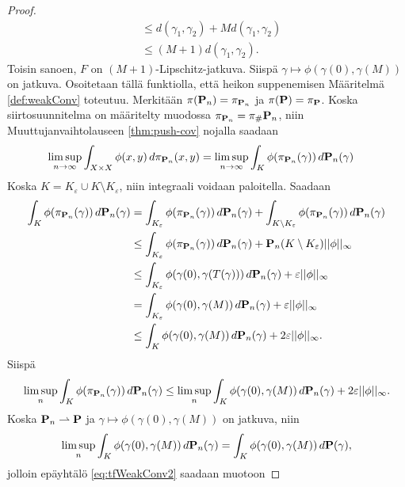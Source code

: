 \documentclass[12pt,oneside,a4paper]{amsbook} %
\begin{document}
\begin{proof}
\begin{align*}
        &\le  d(\gamma_1, \gamma_2) + Md(\gamma_1, \gamma_2) \\
        &\le (M+1)d(\gamma_1, \gamma_2).
    \end{align*}
    Toisin sanoen, $F$ on $(M+1)$-Lipschitz-jatkuva.
    Siispä $\gamma \mapsto \phi(\gamma(0), \gamma(M))$ on jatkuva. Osoitetaan tällä funktiolla, että heikon suppenemisen Määritelmä \ref{def:weakConv} toteutuu. Merkitään $\pi(\P_n) = \pi_{\P_n}$ ja $\pi(\P) = \pi_\P$.  Koska siirtosuunnitelma on määritelty muodossa $\pi_{\P_n} = \pi_\#\P_n$, niin Muuttujanvaihtolauseen \ref{thm:push-cov} nojalla saadaan
    \begin{align*}
        \limsup_{n\to\infty} \int_{X \times X} \phi(x, y) \, d\pi_{\P_n} (x, y) &= \limsup_{n\to\infty} \int_{K} \phi(\pi_{\P_n}(\gamma)) \, d\P_n (\gamma)  
    \end{align*}
    Koska $K = K_\varepsilon \cup K \setminus K_\varepsilon$, niin integraali voidaan paloitella. Saadaan
    \begin{align*}
        \int_{K} \phi(\pi_{\P_n}(\gamma)) \, d\P_n (\gamma) &= \int_{K_\varepsilon} \phi(\pi_{\P_n}(\gamma)) \, d\P_n (\gamma) + \int_{K \setminus K_\varepsilon} \phi(\pi_{\P_n}(\gamma)) \, d\P_n (\gamma) \\
        &\le \int_{K_\varepsilon} \phi(\pi_{\P_n}(\gamma)) \, d\P_n (\gamma) + \P_n(K\setminus K_\varepsilon) ||\phi||_\infty\\
        &\le \int_{K_\varepsilon} \phi(\gamma(0),\gamma(T(\gamma))) \, d\P_n (\gamma) + \varepsilon||\phi||_\infty \\
        &=  \int_{K_\varepsilon} \phi(\gamma(0),\gamma(M)) \, d\P_n (\gamma) + \varepsilon||\phi||_\infty \\
        &\le \int_{K} \phi(\gamma(0),\gamma(M)) \, d\P_n (\gamma) + 2\varepsilon||\phi||_\infty.
    \end{align*}
Siispä 
    \begin{align} \label{eq:tfWeakConv2}
        \limsup_{n} \int_{K} \phi(\pi_{\P_n}(\gamma)) \, d\P_n (\gamma) \le \limsup_n \int_{K} \phi(\gamma(0),\gamma(M)) \, d\P_n (\gamma) + 2\varepsilon||\phi||_\infty.
    \end{align}
Koska $\P_n \rightharpoonup \P$ ja $\gamma \mapsto \phi(\gamma(0), \gamma(M))$ on jatkuva, niin 
    \begin{equation*}
        \limsup_n \int_{K} \phi(\gamma(0),\gamma(M)) \, d\P_n (\gamma) = \int_{K} \phi(\gamma(0),\gamma(M)) \, d\P (\gamma),
    \end{equation*}
jolloin epäyhtälö \eqref{eq:tfWeakConv2} saadaan muotoon

\end{proof}
\end{document}
